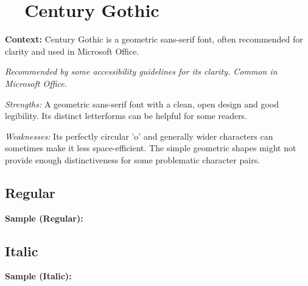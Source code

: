 \pagebreak
\section{~~Century Gothic}\label{app5:sec:centurygothic}
\noindent
\textbf{Context:} Century Gothic is a geometric sans-serif font, often recommended for clarity and used in Microsoft Office.

\emph{Recommended by some accessibility guidelines for its clarity. Common in Microsoft Office.}
\begin{raggedright}
	\emph{Strengths:} A geometric sans-serif font with a clean, open design and good legibility. Its distinct letterforms can be helpful for some readers.

	\emph{Weaknesses:} Its perfectly circular 'o' and generally wider characters can sometimes make it less space-efficient. The simple geometric shapes might not provide enough distinctiveness for some problematic character pairs.

	\subsection{Regular}
	\noindent\textbf{Sample (Regular):}
	\FontSample{\centurygothicfont}

	\subsection{Italic}
	\noindent\textbf{Sample (Italic):}
	\FontSample{{\centurygothicfont\itshape}}
\end{raggedright}
